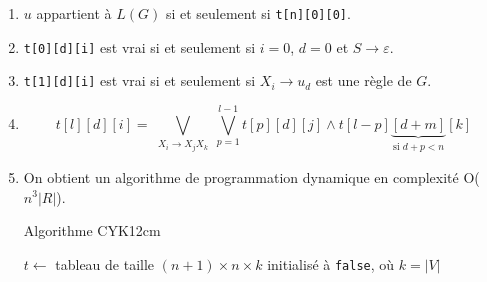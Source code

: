 \documentclass[preview, convert={outfile=\jobname.png}, border={0pt 20pt 40pt 0pt}]{standalone}
\begin{document}
\begin{enumerate}
    \item $u$ appartient à $L(G)$ si et seulement si \texttt{t[n][0][0]}.
    \item \texttt{t[0][d][i]} est vrai si et seulement si $i = 0$, $d = 0$ et $S \rightarrow \varepsilon$.
    \item \texttt{t[1][d][i]} est vrai si et seulement si $X_i \rightarrow u_d$ est une règle de $G$.
    \item $$t[l][d][i] = {\bigvee_{\substack{X_i \rightarrow X_j X_k}} \bigvee_{p = 1}^{l-1} t[p][d][j] \land t[l-p]\underbrace{[d+m]}_{\text{si }d + p < n}[k]}$$
    \item On obtient un algorithme de programmation dynamique en complexité O($n^3 | R |$).
    \begin{algo2}{Algorithme CYK}{12cm}
        \;

        $t \longleftarrow$ tableau de taille $(n + 1) \times n \times k$ initialisé à \texttt{false}, où $k = |V|$\;
    \end{algo2}
\end{enumerate}
\end{document}
